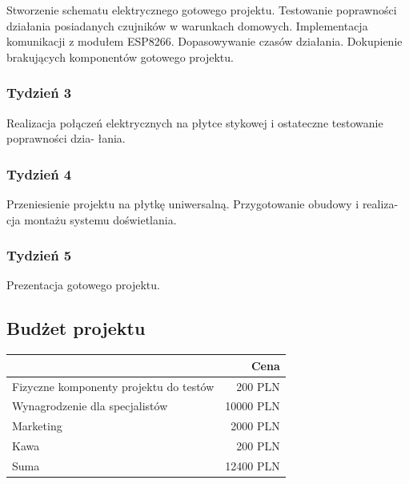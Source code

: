 \documentclass[12pt]{article}
\begin{document}
Stworzenie schematu elektrycznego gotowego projektu. Testowanie poprawności działania posiadanych czujników w warunkach domowych. Implementacja komunikacji z modułem ESP8266. Dopasowywanie czasów działania. 
Dokupienie brakujących komponentów gotowego projektu. 
\subsubsection{Tydzień 3}



Realizacja połączeń elektrycznych na płytce stykowej i ostateczne testowanie poprawności dzia-
łania. 

\subsubsection{Tydzień 4}

Przeniesienie projektu na płytkę uniwersalną. Przygotowanie obudowy i realiza-
cja montażu systemu doświetlania.



\subsubsection{Tydzień 5}

Prezentacja gotowego projektu.

\newpage
\clearpage
\newpage



\subsection{Budżet projektu}


\begin{table}[!h]
	\centering
	\begin{tabular}{l|r}
		 & Cena \\\hline
		
		Fizyczne komponenty projektu do testów & 200 PLN \\
	
		Wynagrodzenie dla specjalistów & 10000 PLN \\
		
		Marketing & 2000 PLN \\
		
		Kawa & 200 PLN 
		\\ \hline
		Suma & 12400 PLN
		
	\end{tabular}
	
\end{table}
\end{document}
